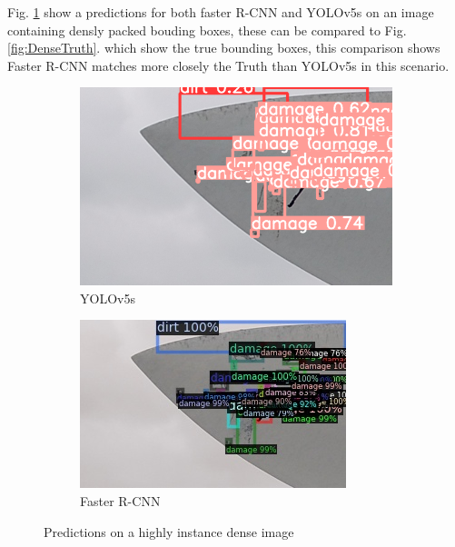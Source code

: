 \documentclass[conference]{IEEEtran}
\begin{document}
Fig. \ref{fig:DensePreds} show a predictions for both faster R-CNN and YOLOv5s on an image containing densly packed bouding boxes, these can be compared to Fig. 
\ref{fig:DenseTruth}. which show the true bounding boxes, this comparison shows Faster R-CNN matches more closely the Truth than YOLOv5s in this scenario.
\begin{figure}[H]
\centering
\begin{subfigure}{.2\textwidth}
    \centering
    \includegraphics[width=1\linewidth]{Images/YOLOPrediction.png}
    \caption{YOLOv5s}
\end{subfigure}%
\begin{subfigure}{.2\textwidth}
    \centering
    \includegraphics[width=1\linewidth]{Images/FasterPrediction.jpg}
    \caption{Faster R-CNN} 
\end{subfigure}
\caption{Predictions on a highly instance dense image}
\label{fig:DensePreds}
\end{figure}
\end{document}
